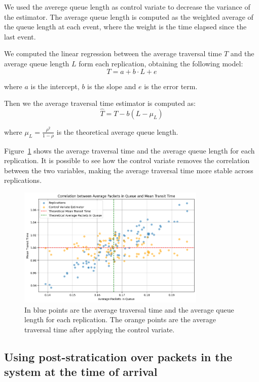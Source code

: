 \documentclass[a4paper]{article}
\begin{document}
We used the averege queue length as control variate to decrease the variance of the estimator. The average queue length is computed as the weighted average of the queue length at each event, where the weight is the time elapsed since the last event.

We computed the linear regression between the average traversal time $T$ and the average queue length
$L$ form each replication, obtaining the following model:
\begin{equation}
  T = a + b \cdot L + e
\end{equation}

where $a$ is the intercept, $b$ is the slope and $e$ is the error term.

Then we the average traversal time estimator is computed as:
\begin{equation}
  \hat{T} = T - b (
    L - \mu_L
  )
\end{equation}

where $\mu_L = \frac{\rho^2}{1 - \rho}$ is the theoretical average queue length.

Figure~\ref{fig:e2p2-corr} shows the average traversal time and the average queue length for each replication. It is possible to see how the control variate removes the correlation between the two variables, making the average traversal time more stable across replications.

\begin{figure}[htbp]
  \centering
  \includegraphics[width=0.8\textwidth]{images/ex2_p2_corr.png}
  \caption{
    In blue points are the average traversal time and the average queue length for each replication.
    The orange points are the average traversal time after applying the control variate.
  }\label{fig:e2p2-corr}
\end{figure}

\subsection*{Using post-stratication over packets in the system at the time of arrival}
\end{document}
